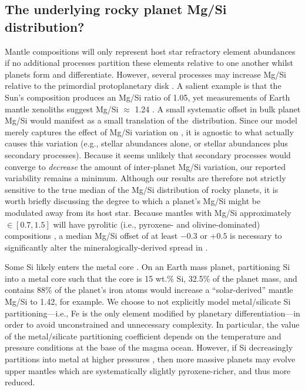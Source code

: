 \subsection{The underlying rocky planet Mg/Si distribution?}\label{sec:discussion-mgsi}

Mantle compositions will only represent host star refractory element abundances if no additional processes partition these elements relative to one another whilst planets form and differentiate. However, several processes may increase Mg/Si relative to the primordial protoplanetary disk \citep{ringwood_significance_1989, tronnes_core_2019, miyazaki_dynamic_2020}. A salient example is that the Sun's composition produces an Mg/Si ratio of 1.05, yet measurements of Earth mantle xenoliths suggest Mg/Si $\approx$ 1.24 \citep[the bulk mantle may not be well-represented by these upper mantle xenoliths;][]{javoy_integral_1995}. A small systematic offset in bulk planet Mg/Si would manifest as a small translation of the \fo\,distribution. Since our model merely captures the effect of Mg/Si variation on \fo, it is agnostic to what actually causes this variation (e.g., stellar abundances alone, or stellar abundances plus secondary processes). Because it seems unlikely that secondary processes would converge to \textit{decrease} the amount of inter-planet Mg/Si variation, our reported \fo\,variability remains a minimum. Although our results are therefore not strictly sensitive to the true median of the Mg/Si distribution of rocky planets, it is worth briefly discussing the degree to which a planet's Mg/Si might be modulated away from its host star. Because mantles with Mg/Si approximately $\in [0.7, 1.5]$ will have pyrolitic (i.e., pyroxene- and olivine-dominated) compositions \citep{guimond_mantle_2023}, a median Mg/Si offset of at least $-0.3$ or $+0.5$ is necessary to significantly alter the mineralogically-derived spread in \fo.


Some Si likely enters the metal core \citep[e.g.,][]{ringwood_chemical_1959, javoy_integral_1995, Wood2006, schaefer_metalsilicate_2017}. On an Earth mass planet, partitioning Si into a metal core such that the core is 15 wt.\% Si, 32.5\% of the planet mass, and contains 88\% of the planet's iron atoms would increase a ``solar-derived'' mantle Mg/Si to 1.42, for example. We choose to not explicitly model metal/silicate Si partitioning---i.e., Fe is the only element modified by planetary differentiation---in order to avoid unconstrained and unnecessary complexity. In particular, the value of the metal/silicate partitioning coefficient depends on the temperature and pressure conditions at the base of the magma ocean.  %
However, if Si decreasingly partitions into metal at higher pressures \citep{schaefer_metalsilicate_2017}, then more massive planets may evolve upper mantles which are systematically slightly pyroxene-richer, and thus more reduced. 

